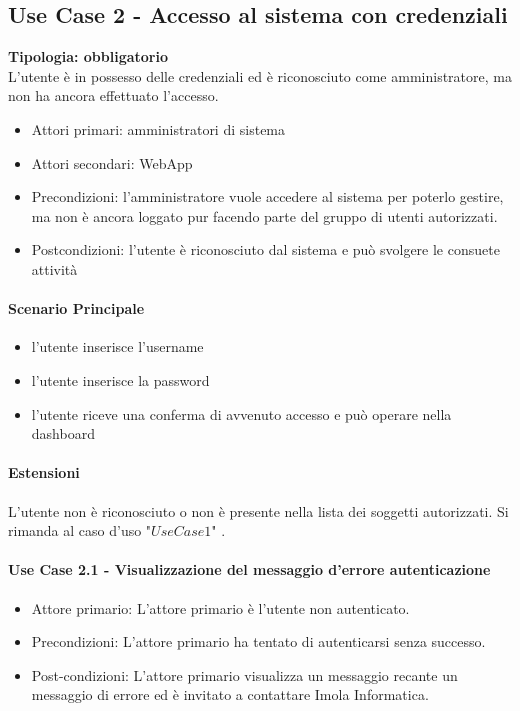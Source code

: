 \documentclass[12pt]{article}
\begin{document}
\subsection{Use Case 2 - Accesso al sistema con credenziali}
\textbf{Tipologia: obbligatorio} \\
L'utente è in possesso delle credenziali ed è riconosciuto come amministratore, ma non ha ancora effettuato l'accesso.
\begin{itemize}
	\item Attori primari: amministratori di sistema
	\item Attori secondari: WebApp
	\item Precondizioni: l'amministratore vuole accedere al sistema per poterlo gestire, ma non è ancora loggato pur facendo parte del gruppo di utenti autorizzati.
	\item Postcondizioni: l'utente è riconosciuto dal sistema e può svolgere le consuete attività
\end{itemize}
\paragraph{Scenario Principale}
\begin{itemize}
	\item l'utente inserisce l'username
	\item l'utente inserisce la password
	\item l'utente riceve una conferma di avvenuto accesso e può operare nella dashboard
\end{itemize}

\paragraph{Estensioni} L'utente non è riconosciuto o non è presente nella lista dei soggetti autorizzati. Si rimanda al caso d'uso "$Use Case 1$" .

\paragraph{Use Case 2.1 - Visualizzazione del messaggio d'errore autenticazione}
\begin{itemize}
	\item Attore primario: L'attore primario è l'utente non autenticato.
	\item Precondizioni: L'attore primario ha tentato di autenticarsi senza successo.
	\item Post-condizioni: L'attore primario visualizza un messaggio recante un messaggio di errore ed è invitato a contattare Imola Informatica.
\end{itemize}
\end{document}
